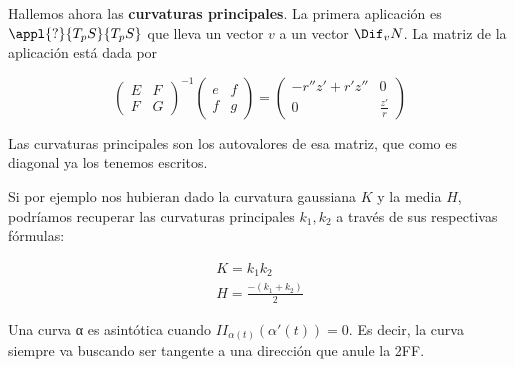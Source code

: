 \begin{problem}[3]
Hallemos ahora las \textbf{curvaturas principales}. La primera aplicación es $\appl{?}{T_pS}{T_pS}$ que lleva un vector $v$ a un vector $\Dif_vN$. La matriz de la aplicación está dada por 

\[ \begin{pmatrix}
E & F \\ F & G
\end{pmatrix}^{-1}
\begin{pmatrix}
e & f \\ f & g
\end{pmatrix} = \begin{pmatrix}
-r''z' + r'z'' & 0 \\ 0 & \frac{z'}{r}
\end{pmatrix}\]

Las curvaturas principales son los autovalores de esa matriz, que como es diagonal ya los tenemos escritos.

Si por ejemplo nos hubieran dado la curvatura gaussiana $K$ y la media $H$, podríamos recuperar las curvaturas principales $k_1,k_2$ a través de sus respectivas fórmulas:

\begin{gather*}
 K = k_1k_2 \\
 H = \frac{-(k_1 + k_2)}{2}
\end{gather*}

\end{problem}

Una curva α es asintótica cuando $II_{α(t)}(α'(t)) = 0$. Es decir, la curva siempre va buscando ser tangente a una dirección que anule la 2FF.